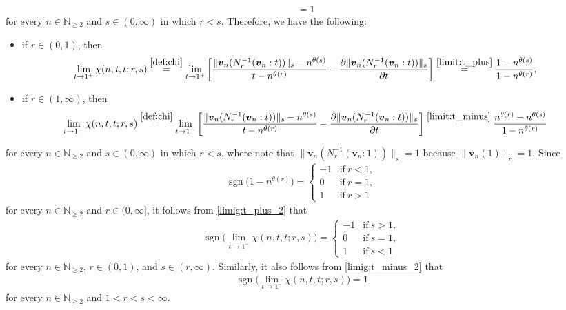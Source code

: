 \documentclass[conference, draftcls, onecolumn]{IEEEtran}
\theoremstyle{plain}
\newcommand{\bvec}[1]{\boldsymbol{#1}}
\newcommand{\sgn}{\operatorname{sgn}}
\newcommand{\lemref}[1]{Lemma~\ref{#1}}
\begin{document}
\begin{IEEEproof}[Proof of \lemref{lem:slope_v}]
\begin{align}
& =
1
\label{limit:t_minus}
\end{align}
for every $n \in \mathbb{N}_{\ge 2}$ and $s \in (0, \infty)$ in which $r < s$.
Therefore, we have the following:
\begin{itemize}
\item
if $r \in (0, 1)$, then
\begin{align}
\lim_{t \to 1^{+}} \chi(n, t, t; r, s)
& \overset{\eqref{def:chi}}{=}
\lim_{t \to 1^{+}} \bigg[ \frac{ \| \bvec{v}_{n}( N_{r}^{-1}( \bvec{v}_{n} : t )) \|_{s} - n^{\theta( s )} }{ t - n^{\theta( r )} } - \frac{ \partial \| \bvec{v}_{n}( N_{r}^{-1}( \bvec{v}_{n} : t ) ) \|_{s} }{ \partial t } \bigg]
\overset{\eqref{limit:t_plus}}{=}
\frac{ 1 - n^{\theta( s )} }{ 1 - n^{\theta( r )} } ,
\label{limig:t_plus_2}
\end{align}
\item
if $r \in (1, \infty)$, then
\begin{align}
\lim_{t \to 1^{-}} \chi(n, t, t; r, s)
& \overset{\eqref{def:chi}}{=}
\lim_{t \to 1^{-}} \bigg[ \frac{ \| \bvec{v}_{n}( N_{r}^{-1}( \bvec{v}_{n} : t )) \|_{s} - n^{\theta( s )} }{ t - n^{\theta( r )} } - \frac{ \partial \| \bvec{v}_{n}( N_{r}^{-1}( \bvec{v}_{n} : t ) ) \|_{s} }{ \partial t } \bigg]
\overset{\eqref{limit:t_minus}}{=}
\frac{ n^{\theta( r )} - n^{\theta( s )} }{ 1 - n^{\theta( r )} }
\label{limig:t_minus_2}
\end{align}
\end{itemize}
for every $n \in \mathbb{N}_{\ge 2}$ and $s \in (0, \infty)$ in which $r < s$, where note that $\| \bvec{v}_{n}( N_{r}^{-1}( \bvec{v}_{n} : 1 ) ) \|_{s} = 1$ because $\| \bvec{v}_{n}( 1 ) \|_{r} = 1$.
Since
\begin{align}
\sgn\Big( 1 - n^{\theta( r )} \Big)
=
\begin{cases}
-1
& \mathrm{if} \ r < 1 ,
\\
0
& \mathrm{if} \ r = 1 ,
\\
1
& \mathrm{if} \ r > 1
\end{cases}
\end{align}
for every $n \in \mathbb{N}_{\ge 2}$ and $r \in (0, \infty]$, it follows from \eqref{limig:t_plus_2} that
\begin{align}
\sgn\Big( \lim_{t \to 1^{+}} \chi(n, t, t; r, s) \Big)
=
\begin{cases}
-1
& \mathrm{if} \ s > 1 ,
\\
0
& \mathrm{if} \ s = 1 ,
\\
1
& \mathrm{if} \ s < 1
\end{cases}
\label{limig:t_plus_3}
\end{align}
for every $n \in \mathbb{N}_{\ge 2}$, $r \in (0, 1)$, and $s \in (r, \infty)$.
Similarly, it also follows from \eqref{limig:t_minus_2} that
\begin{align}
\sgn\Big( \lim_{t \to 1^{-}} \chi(n, t, t; r, s) \Big)
=
1
\label{limig:t_minus_3}
\end{align}
for every $n \in \mathbb{N}_{\ge 2}$ and $1 < r < s < \infty$.



\end{IEEEproof}
\end{document}
